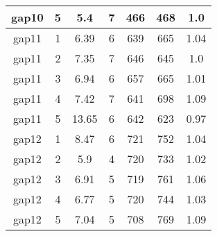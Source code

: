 \documentclass[12pt, a4paper]{article}
\begin{document}
\begin{longtable}{|c|c|c|c|c|c|c|}
  \hline
  gap10 & 5 & 5.4 & 7 & 466 & 468 & 1.0 \\
  \hline
  gap11 & 1 & 6.39 & 6 & 639 & 665 & 1.04 \\
  \hline
  gap11 & 2 & 7.35 & 7 & 646 & 645 & 1.0 \\
  \hline
  gap11 & 3 & 6.94 & 6 & 657 & 665 & 1.01 \\
  \hline
  gap11 & 4 & 7.42 & 7 & 641 & 698 & 1.09 \\
  \hline
  gap11 & 5 & 13.65 & 6 & 642 & 623 & 0.97 \\
  \hline
  gap12 & 1 & 8.47 & 6 & 721 & 752 & 1.04 \\
  \hline
  gap12 & 2 & 5.9 & 4 & 720 & 733 & 1.02 \\
  \hline
  gap12 & 3 & 6.91 & 5 & 719 & 761 & 1.06 \\
  \hline
  gap12 & 4 & 6.77 & 5 & 720 & 744 & 1.03 \\
  \hline
  gap12 & 5 & 7.04 & 5 & 708 & 769 & 1.09 \\
  \hline
\end{longtable}
\end{document}
